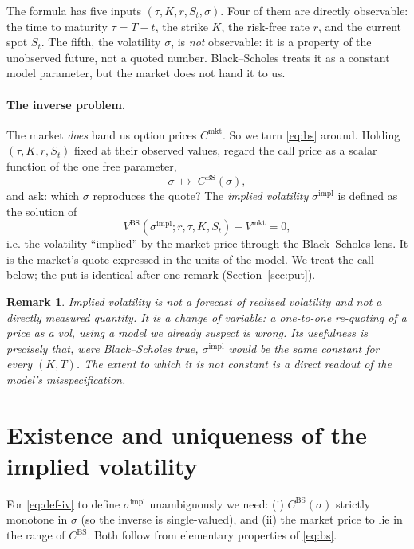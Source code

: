 \documentclass[11pt]{article}
\newtheorem{remark}{Remark}
\newcommand{\impl}{\mathrm{impl}}
\newcommand{\mkt}{\mathrm{mkt}}
\newcommand{\BS}{\mathrm{BS}}
\begin{document}
The formula has five inputs $(\tau,K,r,S_t,\sigma)$. Four of them are directly observable:
the time to maturity $\tau=T-t$, the strike $K$, the risk-free rate $r$, and the current spot
$S_t$. The fifth, the volatility $\sigma$, is \emph{not} observable: it is a property of the
unobserved future, not a quoted number. Black--Scholes treats it as a constant model parameter,
but the market does not hand it to us.

\paragraph{The inverse problem.} The market \emph{does} hand us option prices $C^{\mkt}$. So we
turn \eqref{eq:bs} around. Holding $(\tau,K,r,S_t)$ fixed at their observed values, regard the
call price as a scalar function of the one free parameter,
\[
\sigma\;\longmapsto\;C^{\BS}(\sigma),
\]
and ask: which $\sigma$ reproduces the quote? The \emph{implied volatility} $\sigma^{\impl}$ is
defined as the solution of
\begin{equation}\label{eq:def-iv}
V^{\BS}(\sigma^{\impl};r,\tau,K,S_t)-V^{\mkt}=0,
\end{equation}
i.e. the volatility ``implied'' by the market price through the Black--Scholes lens. It is the
market's quote expressed in the units of the model. We treat the call below; the put is identical
after one remark (Section~\ref{sec:put}).

\begin{remark}
Implied volatility is \emph{not} a forecast of realised volatility and \emph{not} a directly
measured quantity. It is a change of variable: a one-to-one re-quoting of a price as a vol,
using a model we already suspect is wrong. Its usefulness is precisely that, were Black--Scholes
true, $\sigma^{\impl}$ would be the same constant for every $(K,T)$. The extent to which it is
\emph{not} constant is a direct readout of the model's misspecification.
\end{remark}

\section{Existence and uniqueness of the implied volatility}

For \eqref{eq:def-iv} to define $\sigma^{\impl}$ unambiguously we need: (i) $C^{\BS}(\sigma)$
strictly monotone in $\sigma$ (so the inverse is single-valued), and (ii) the market price to lie
in the range of $C^{\BS}$. Both follow from elementary properties of \eqref{eq:bs}.
\end{document}
